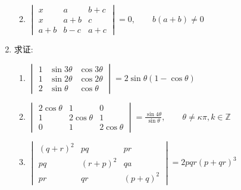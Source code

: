 \begin{enumerate}
\begin{enumerate}
    \item $\begin{vmatrix}x & a & b+c \\ x & a+b & c \\ a+b & b-c & a+c\end{vmatrix}=0,\qquad b(a+b)\ne 0$
\end{enumerate}


\item  求证:
\begin{enumerate}
    \item $\begin{vmatrix}1 & \sin 3 \theta & \cos 3 \theta \\ 1 & \sin 2 \theta & \cos 2 \theta \\ 2 & \sin  \theta & \cos \theta\end{vmatrix}=2 \sin \theta(1-\cos \theta)$
    \item $\begin{vmatrix}2 \cos \theta & 1 & 0 \\ 1 & 2 \cos \theta & 1 \\ 0 & 1 & 2 \cos \theta\end{vmatrix}=\frac{\sin 4 \theta}{\sin \theta},\qquad \theta\ne \kappa \pi, k \in \mathbb{Z}$
    \item $\begin{vmatrix}(q+r)^{2} & p q & p r \\ p q & (r+p)^{2} & q a \\ p r & q r & (p+q)^{2}\end{vmatrix}=2 p q r\left(p+q{r}\right)^{3}$
\end{enumerate}


\end{enumerate}
